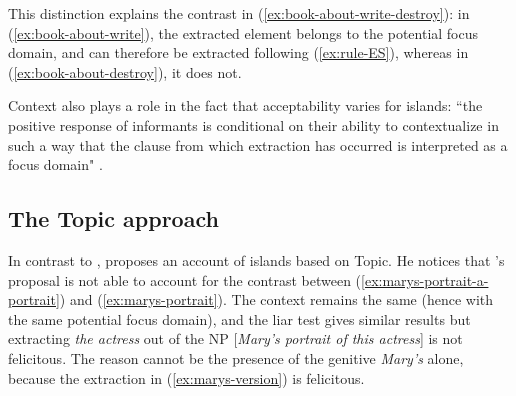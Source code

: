 \eal\label{ex:liar-test-rhinoceros}
 \label{ex:liar-test-rhinoceros-wrote}
 \label{ex:liar-test-rhinoceros-destroy}
\zl 

This distinction explains the contrast in (\ref{ex:book-about-write-destroy}): in (\ref{ex:book-about-write}), the extracted element belongs to the potential focus domain, and can therefore be extracted following (\ref{ex:rule-ES}), whereas in (\ref{ex:book-about-destroy}), it does not.

\begin{exe}
\ex \citep[272]{Bach.1976}
\label{ex:book-about-write-destroy}
\begin{xlist}
\end{xlist}
\end{exe}

Context also plays a role in the fact that acceptability varies for islands: ``the positive response of informants is conditional on their ability to contextualize in such a way that the clause from which extraction has occurred is interpreted as a focus domain" \citep[320]{Erteschik-Shir.2006}.

\subsection{The Topic approach}\largerpage[-2]

In contrast to \citeauthor{Erteschik-Shir.1973}, \citet{Kuno.1987} proposes an account of islands based on Topic. He notices that \citeauthor{Erteschik-Shir.1973}'s proposal is not able to account for the contrast between (\ref{ex:marys-portrait-a-portrait}) and (\ref{ex:marys-portrait}). The context remains the same (hence with the same potential focus domain), and the liar test gives similar results but extracting \emph{the actress} out of the NP [\emph{Mary's portrait of this actress}] is not felicitous. The reason cannot be the presence of the  genitive \emph{Mary's} alone, because the extraction in (\ref{ex:marys-version}) is felicitous. 
\pagebreak
\begin{exe}
\ex \citep[13]{Kuno.1987} 
\label{ex:marys-portrait-version}
\begin{xlist}
\label{ex:marys-version}
\end{xlist}
\end{exe}

